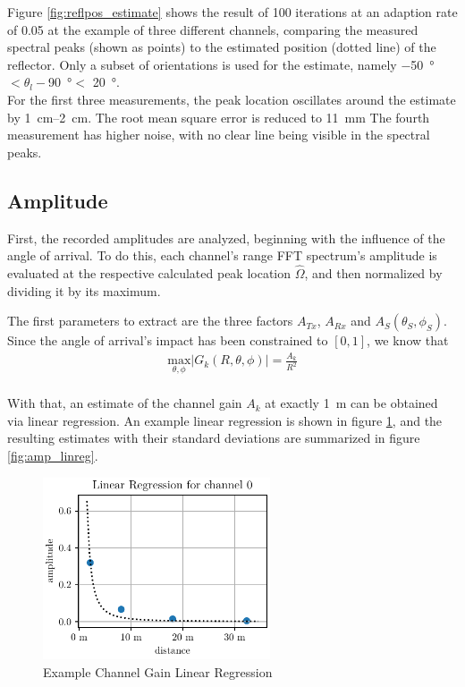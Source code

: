 Figure \ref{fig:reflpos_estimate} shows the result of 100 iterations at an adaption rate of 0.05 at the example of three different channels,
comparing the measured spectral peaks (shown as points) to the estimated position (dotted line) of the reflector.
Only a subset of orientations is used for the estimate,
namely \SI{-50}{\degree} $<\theta_l-$\SI{90}{\degree}$<$ \SI{20}{\degree}. \\


For the first three measurements, the peak location oscillates around the estimate by \SIrange[range-units=single]{1}{2}{\cm}.
The root mean square error is reduced to \SI{11}{\mm}
The fourth measurement has higher noise, with no clear line being visible in the spectral peaks.

\subsection{Amplitude}
\label{ssec:amplitude}
First, the recorded amplitudes are analyzed, beginning with the influence of the angle of arrival.
To do this, each channel's range FFT spectrum's amplitude is evaluated at the respective calculated peak location $\hat \Omega$,
and then normalized by dividing it by its maximum.

The first parameters to extract are the three factors $A_{Tx}$, $A_{Rx}$ and $A_S(\theta_S,\phi_S)$.
Since the angle of arrival's impact has been constrained to $[0,1]$, we know that
\begin{align}
    \underset{\theta,\phi}{\text{max}} |G_k(R,\theta,\phi)|  = \frac{A_k}{R^2} \label{eqn:max_G}
\end{align} \\
With that, an estimate of the channel gain $A_k$ at exactly \SI{1}{\meter} can be obtained via linear regression.
An example linear regression is shown in figure \ref{fig:ch0_amp_linreg},
and the resulting estimates with their standard deviations are summarized in figure \ref{fig:amp_linreg}. \\

\begin{figure}
    \centering
    \includegraphics[width=0.6\textwidth]{../figures/ch0_amplitude_linreg.pdf}
    \caption{Example Channel Gain Linear Regression}
    \label{fig:ch0_amp_linreg}
\end{figure}

